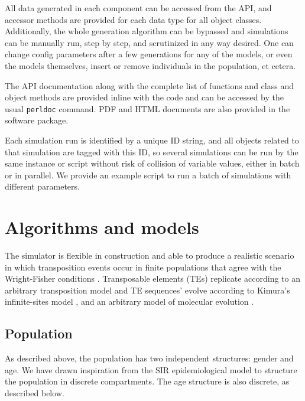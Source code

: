 \documentclass[10pt]{article}
\begin{document}
All data generated in each component can be accessed from the API, and
accessor methods are provided for each data type for all object
classes. Additionally, the whole generation algorithm can be bypassed
and simulations can be manually run, step by step, and scrutinized in
any way desired. One can change config parameters after a few
generations for any of the models, or even the models themselves,
insert or remove individuals in the population, et cetera.

The API documentation along with the complete list of functions and
class and object methods are provided inline with the code and can be
accessed by the usual \verb|perldoc| command. PDF and HTML documents
are also provided in the software package.

Each simulation run is identified by a unique ID string, and all
objects related to that simulation are tagged with this ID, so several
simulations can be run by the same instance or script without risk of
collision of variable values, either in batch or in parallel. We
provide an example script to run a batch of simulations with different
parameters.


\section{Algorithms and models}

The simulator is flexible in construction and able to produce a
realistic scenario in which transposition events occur in finite
populations that agree with the Wright-Fisher
conditions \cite{HC98}. Transposable elements (TEs) replicate according
to an arbitrary transposition model and TE sequences' evolve according
to Kimura's infinite-sites model \cite{Taj96}, and an arbitrary model
of molecular evolution \cite{Yan06}.

\subsection{Population}



As described above, the population has two independent structures:
gender and age. We have drawn inspiration from the SIR epidemiological
model to structure the population in discrete compartments. The age
structure is also discrete, as described below.
\end{document}
